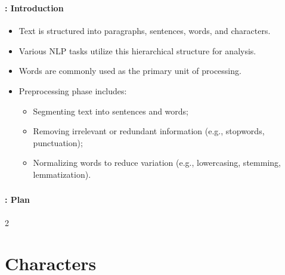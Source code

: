 \documentclass[xcolor=table]{beamer}
\subtitle[03- Basic text processing]{Chapter 03\\Basic text processing}
\begin{document}
	
\begin{frame}
	\frametitle{\inserttitle}
	\framesubtitle{\insertshortsubtitle: Introduction}
	
	\begin{itemize}
		\item Text is structured into paragraphs, sentences, words, and characters.
		\item Various NLP tasks utilize this hierarchical structure for analysis.
		\item Words are commonly used as the primary unit of processing.
		\item Preprocessing phase includes:
		\begin{itemize}
			\item Segmenting text into sentences and words;
			\item Removing irrelevant or redundant information (e.g., stopwords, punctuation);
			\item Normalizing words to reduce variation (e.g., lowercasing, stemming, lemmatization).
		\end{itemize}
	\end{itemize}

\end{frame}


\begin{frame}
	\frametitle{\inserttitle}
	\framesubtitle{\insertshortsubtitle: Plan}
	
	\begin{multicols}{2}
	\tableofcontents
	\end{multicols}
\end{frame}

\section{Characters}
\end{document}
